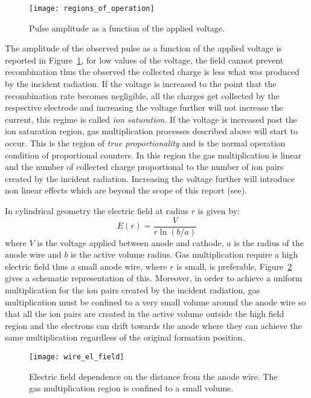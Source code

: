 \begin{figure}[!h]
  \centering
  \texttt{[image: regions\_of\_operation]}
  \caption{Pulse amplitude as a function of the applied voltage\autocite{Knoll:RadMeasurement}.}
  \label{fig:reg_of_operation}
\end{figure}
The amplitude of the observed pulse as a function of the applied voltage is
reported in Figure~\ref{fig:reg_of_operation}, for low values of the voltage,
the field cannot prevent recombination thus the observed the collected charge is
less what was produced by the incident radiation. If the voltage is increased to
the point that the recombination rate becomes negligible, all the charges get
collected by the respective electrode and increasing the voltage further will
not increase the current, this regime is called \emph{ion saturation}. If the
voltage is increased past the ion saturation region, gas multiplication
processes described above will start to occur. This is the region of \emph{true
  proportionality} and is the normal operation condition of proportional
counters. In this region the gas multiplication is linear and the number of
collected charge proportional to the number of ion pairs created by the incident
radiation. Increasing the voltage further will introduce non linear effects
which are beyond the scope of this report (see\autocite{Knoll:RadMeasurement}).

In cylindrical geometry the electric field at radius $r$ is given by:
\begin{equation}
  \label{eq:cyl_el_field}
  E(r) = \frac{V}{r \ln (b / a)}
\end{equation}
where $V$ is the voltage applied between anode and cathode, $a$ is the radius of
the anode wire and $b$ is the active volume radius. Gas multiplication require a
high electric field thus a small anode wire, where $r$ is small, is preferable,
Figure~\ref{fig:wire_el_field} gives a schematic representation of this.
Moreover, in order to achieve a uniform multiplication for the ion pairs created
by the incident radiation, gas multiplication must be confined to a very small
volume around the anode wire so that all the ion pairs are created in the active
volume outside the high field region and the electrons can drift towards the
anode where they can achieve the same multiplication regardless of the original
formation position.
\begin{figure}[!h]
  \centering
  \texttt{[image: wire\_el\_field]}
  \caption{Electric field dependence on the distance from the anode wire. The
    gas multiplication region is confined to a small volume\autocite{Knoll:RadMeasurement}.}
  \label{fig:wire_el_field}
\end{figure}
